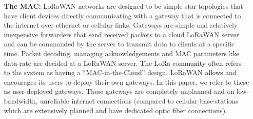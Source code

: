 \vspace*{0.02in}

\noindent \textbf{The MAC: }  LoRaWAN networks
are designed to be simple star-topologies that have client devices directly
communicating with a gateway that is connected to the internet over ethernet
or cellular links. Gateways are simple and relatively inexpensive forwarders
that send received packets to a cloud LoRaWAN server and can be commanded by
the server to transmit data to clients at a specific time. Packet decoding,
managing acknowledgements and MAC parameters like data-rate are decided at a
LoRaWAN server. The LoRa community often refers to the system as having a
``MAC-in-the-Cloud'' design. LoRaWAN allows and encourages its users to deploy
their own gateways. In this paper, we refer to these as user-deployed gateways. These gateways are completely unplanned and on low-bandwidth,
unreliable internet connections (compared to cellular base-stations which are
extensively planned and have dedicated optic fiber connections). 




